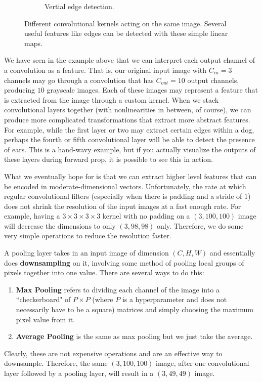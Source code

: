 \begin{example}
\begin{figure}[H]
\begin{subfigure}[b]{0.32\textwidth}
          \caption{Vertial edge detection. }
          \label{fig:vertical_edge}
      \end{subfigure} 

      \caption{Different convolutional kernels acting on the same image. Several useful features like edges can be detected with these simple linear maps. }
      \label{fig:feature_extraction}
    \end{figure}
  \end{example}

  We have seen in the example above that we can interpret each output channel of a convolution as a feature. That is, our original input image with $C_{in} = 3$ channels may go through a convolution that has $C_{out} = 10$ output channels, producing $10$ grayscale images. Each of these images may represent a feature that is extracted from the image through a custom kernel. When we stack convolutional layers together (with nonlinearities in between, of course), we can produce more complicated transformations that extract more abstract features. For example, while the first layer or two may extract certain edges within a dog, perhaps the fourth or fifth convolutional layer will be able to detect the presence of ears. This is a hand-wavy example, but if you actually visualize the outputs of these layers during forward prop, it is possible to see this in action.  

  What we eventually hope for is that we can extract higher level features that can be encoded in moderate-dimensional vectors. Unfortunately, the rate at which regular convolutional filters (especially when there is padding and a stride of $1$) does not shrink the resolution of the input images at a fast enough rate. For example, having a $3 \times 3 \times 3 \times 3$ kernel with no padding on a $(3, 100, 100)$ image will decrease the dimensions to only $(3, 98, 98)$ only. Therefore, we do some very simple operations to reduce the resolution faster. 

  \begin{definition}
    A pooling layer takes in an input image of dimension $(C, H, W)$ and essentially does \textbf{downsampling} on it, involving some method of pooling local groups of pixels together into one value. There are several ways to do this: 
    \begin{enumerate}
      \item \textbf{Max Pooling} refers to dividing each channel of the image into a ``checkerboard" of $P \times P$ (where $P$ is a hyperparameter and does not necessarily have to be a square) matrices and simply choosing the maximum pixel value from it. 
      \item \textbf{Average Pooling} is the same as max pooling but we just take the average. 
    \end{enumerate}
    Clearly, these are not expensive operations and are an effective way to downsample. Therefore, the same $(3, 100, 100)$ image, after one convolutional layer followed by a pooling layer, will result in a $(3, 49, 49)$ image.  
  \end{definition}

